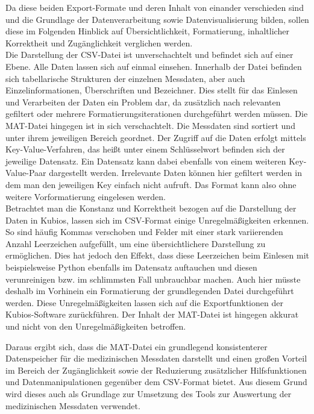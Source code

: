 Da diese beiden Export-Formate und deren Inhalt von einander verschieden sind und die Grundlage der Datenverarbeitung sowie Datenvisualisierung bilden, sollen diese im Folgenden Hinblick auf Übersichtlichkeit, Formatierung, inhaltlicher Korrektheit und Zugänglichkeit verglichen werden.\\
Die Darstellung der CSV-Datei ist unverschachtelt und befindet sich auf einer Ebene. Alle Daten lassen sich auf einmal einsehen. Innerhalb der Datei befinden sich tabellarische Strukturen der einzelnen Messdaten, aber auch Einzelinformationen, Überschriften und Bezeichner. Dies stellt für das Einlesen und Verarbeiten der Daten ein Problem dar, da zusätzlich nach relevanten gefiltert oder mehrere Formatierungsiterationen durchgeführt werden müssen. Die MAT-Datei hingegen ist in sich verschachtelt. Die Messdaten sind sortiert und unter ihrem jeweiligen Bereich geordnet. Der Zugriff auf die Daten erfolgt mittels Key-Value-Verfahren, das heißt unter einem Schlüsselwort befinden sich der jeweilige Datensatz. Ein Datensatz kann dabei ebenfalls von einem weiteren Key-Value-Paar dargestellt werden. Irrelevante Daten können hier gefiltert werden in dem man den jeweiligen Key einfach nicht aufruft. Das Format kann also ohne weitere Vorformatierung eingelesen werden.\\
Betrachtet man die Konstanz und Korrektheit bezogen auf die Darstellung der Daten in Kubios, lassen sich im CSV-Format einige Unregelmäßigkeiten erkennen. So sind häufig Kommas verschoben und Felder mit einer stark variierenden Anzahl Leerzeichen aufgefüllt, um eine übersichtlichere Darstellung zu ermöglichen. Dies hat jedoch den Effekt, dass diese Leerzeichen beim Einlesen mit beispielsweise Python ebenfalls im Datensatz auftauchen und diesen verunreinigen bzw. im schlimmsten Fall unbrauchbar machen. Auch hier müsste deshalb im Vorhinein ein Formatierung der grundlegenden Datei durchgeführt werden. Diese Unregelmäßigkeiten lassen sich auf die Exportfunktionen der Kubios-Software zurückführen. Der Inhalt der MAT-Datei ist hingegen akkurat und nicht von den Unregelmäßigkeiten betroffen.

Daraus ergibt sich, dass die MAT-Datei ein grundlegend konsistenterer Datenspeicher für die medizinischen Messdaten darstellt und einen großen Vorteil im Bereich der Zugänglichkeit sowie der Reduzierung zusätzlicher Hilfsfunktionen und Datenmanipulationen gegenüber dem CSV-Format bietet. Aus diesem Grund wird dieses auch als Grundlage zur Umsetzung des Tools zur Auswertung der medizinischen Messdaten verwendet.


